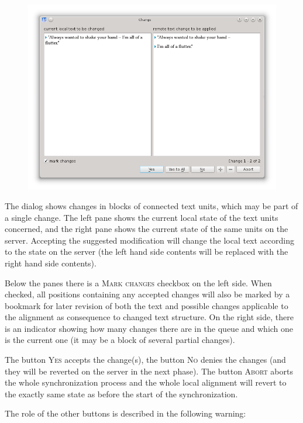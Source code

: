\documentclass[a4paper,10pt,oneside]{book}
\newcommand{\menu}[1]{\textsc{#1}}
\begin{document}
\begin{figure}[htb]
 \includegraphics[width=\textwidth]{screenshots/change.png}
\end{figure}

The dialog shows changes in blocks of connected text units, which may be part of a single change. The left pane shows the current local state of the text units concerned, and the right pane shows the current state of the same units on the server. Accepting the suggested modification will change the local text according to the state on the server (the left hand side contents will be replaced with the right hand side contents).

Below the panes there is a \menu{Mark changes} checkbox on the left side. When checked, all positions containing any accepted changes will also be marked by a bookmark for later revision of both the text and possible changes applicable to the alignment as consequence to changed text structure. On the right side, there is an indicator showing how many changes there are in the queue and which one is the current one (it may be a block of several partial changes).

The button \menu{Yes} accepts the change(s), the button \menu{No} denies the changes (and they will be reverted on the server in the next phase). The button \menu{Abort} aborts the whole synchronization process and the whole local alignment will revert to the exactly same state as before the start of the synchronization.

The role of the other buttons is described in the following warning:
\end{document}
